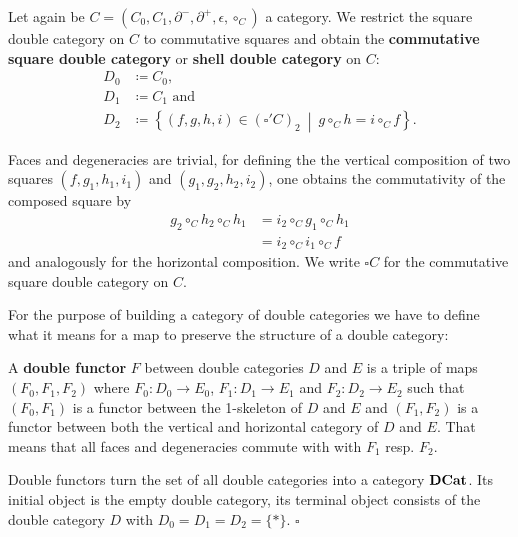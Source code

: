 \begin{example} \label{def:shell-dbl-cat}
Let again be $C = (C_0, C_1, \partial^-, \partial^+, \epsilon, \circ_C)$ a category.
We restrict the square double category on $C$ to commutative squares and obtain
the \textbf{commutative square double category} or \textbf{shell double category}
on $C$:
\begin{align*}
D_0 &\coloneqq C_0 \text{,} \\
D_1 &\coloneqq C_1 \text{ and } \\
D_2 &\coloneqq \left\{ (f, g, h, i) \in (\square'C)_2 ~\middle|~ g \circ_C h = i \circ_C f \right\} \text{.}
\end{align*}

Faces and degeneracies are trivial, for defining the the vertical composition of
two squares $(f, g_1, h_1, i_1)$ and $(g_1, g_2, h_2, i_2)$, one obtains the
commutativity of the composed square by
\begin{align*}
g_2 \circ_C h_2 \circ_C h_1 &= i_2 \circ_C g_1 \circ_C h_1 \\
	&= i_2 \circ_C i_1 \circ_C f
\end{align*}
and analogously for the horizontal composition. We write $\square C$ for the
commutative square double category on $C$.
\end{example}

For the purpose of building a category of double categories we have to define what
it means for a map to preserve the structure of a double category:

\begin{defn} \label{def:dbl-functor}
A \textbf{double functor} $F$ between double categories $D$ and $E$ is a triple of maps
$(F_0, F_1, F_2)$ where $F_0 : D_0 \to E_0$, $F_1 : D_1 \to E_1$ and $F_2 : D_2
\to E_2$ such that $(F_0,F_1)$ is a functor between the 1-skeleton of $D$ and $E$
and $(F_1,F_2)$ is a functor between both the vertical and horizontal category
of $D$ and $E$. That means that all faces and degeneracies commute with with $F_1$
resp. $F_2$.
\end{defn}

\begin{lemma} \label{def:cat-of-dbl-cat}
Double functors turn the set of all double categories into a category $\mathbf{DCat}$.
Its initial object is the empty double category, its terminal object consists of the
double category $D$ with $D_0 = D_1 = D_2 = \{\ast\}$.
\hfill $\square$
\end{lemma}

